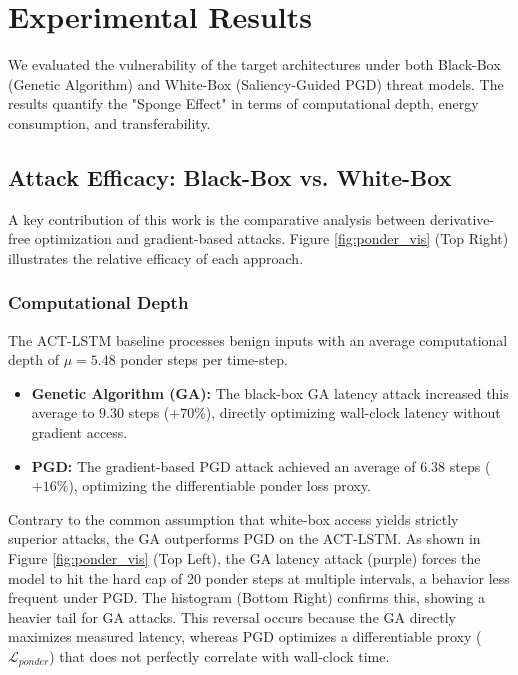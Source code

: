 \section{Experimental Results}
\label{sec:results}

We evaluated the vulnerability of the target architectures under both Black-Box (Genetic Algorithm) and White-Box (Saliency-Guided PGD) threat models. The results quantify the "Sponge Effect" in terms of computational depth, energy consumption, and transferability.

\subsection{Attack Efficacy: Black-Box vs. White-Box}
A key contribution of this work is the comparative analysis between derivative-free optimization and gradient-based attacks. Figure \ref{fig:ponder_vis} (Top Right) illustrates the relative efficacy of each approach.

\subsubsection{Computational Depth}
The ACT-LSTM baseline processes benign inputs with an average computational depth of $\mu=5.48$ ponder steps per time-step.
\begin{itemize}
    \item \textbf{Genetic Algorithm (GA):} The black-box GA latency attack increased this average to $9.30$ steps ($+70\%$), directly optimizing wall-clock latency without gradient access.
    \item \textbf{PGD:} The gradient-based PGD attack achieved an average of $6.38$ steps ($+16\%$), optimizing the differentiable ponder loss proxy.
\end{itemize}
Contrary to the common assumption that white-box access yields strictly superior attacks, the GA outperforms PGD on the ACT-LSTM. As shown in Figure \ref{fig:ponder_vis} (Top Left), the GA latency attack (purple) forces the model to hit the hard cap of 20 ponder steps at multiple intervals, a behavior less frequent under PGD. The histogram (Bottom Right) confirms this, showing a heavier tail for GA attacks. This reversal occurs because the GA directly maximizes measured latency, whereas PGD optimizes a differentiable proxy ($\mathcal{L}_{ponder}$) that does not perfectly correlate with wall-clock time.


